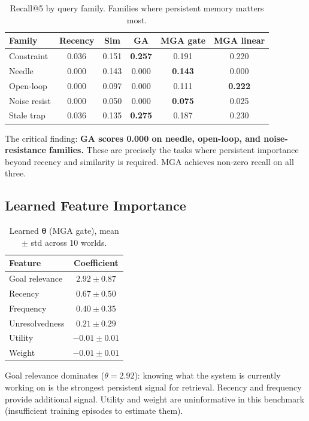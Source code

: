 \documentclass[11pt,a4paper]{article}
\begin{document}
\begin{table}[h]
\centering
\caption{Recall@5 by query family. Families where persistent memory matters most.}
\begin{tabular}{lccccc}
\toprule
\textbf{Family} & \textbf{Recency} & \textbf{Sim} & \textbf{GA} & \textbf{MGA gate} & \textbf{MGA linear} \\
\midrule
Constraint & 0.036 & 0.151 & \textbf{0.257} & 0.191 & 0.220 \\
Needle & 0.000 & 0.143 & 0.000 & \textbf{0.143} & 0.000 \\
Open-loop & 0.000 & 0.097 & 0.000 & 0.111 & \textbf{0.222} \\
Noise resist & 0.000 & 0.050 & 0.000 & \textbf{0.075} & 0.025 \\
Stale trap & 0.036 & 0.135 & \textbf{0.275} & 0.187 & 0.230 \\
\bottomrule
\end{tabular}
\end{table}

The critical finding: \textbf{GA scores 0.000 on needle, open-loop, and noise-resistance families.} These are precisely the tasks where persistent importance beyond recency and similarity is required. MGA achieves non-zero recall on all three.

\subsection{Learned Feature Importance}

\begin{table}[h]
\centering
\caption{Learned $\boldsymbol{\theta}$ (MGA gate), mean $\pm$ std across 10 worlds.}
\begin{tabular}{lc}
\toprule
\textbf{Feature} & \textbf{Coefficient} \\
\midrule
Goal relevance & $2.92 \pm 0.87$ \\
Recency & $0.67 \pm 0.50$ \\
Frequency & $0.40 \pm 0.35$ \\
Unresolvedness & $0.21 \pm 0.29$ \\
Utility & $-0.01 \pm 0.01$ \\
Weight & $-0.01 \pm 0.01$ \\
\bottomrule
\end{tabular}
\end{table}

Goal relevance dominates ($\theta = 2.92$): knowing what the system is currently working on is the strongest persistent signal for retrieval. Recency and frequency provide additional signal. Utility and weight are uninformative in this benchmark (insufficient training episodes to estimate them).
\end{document}
